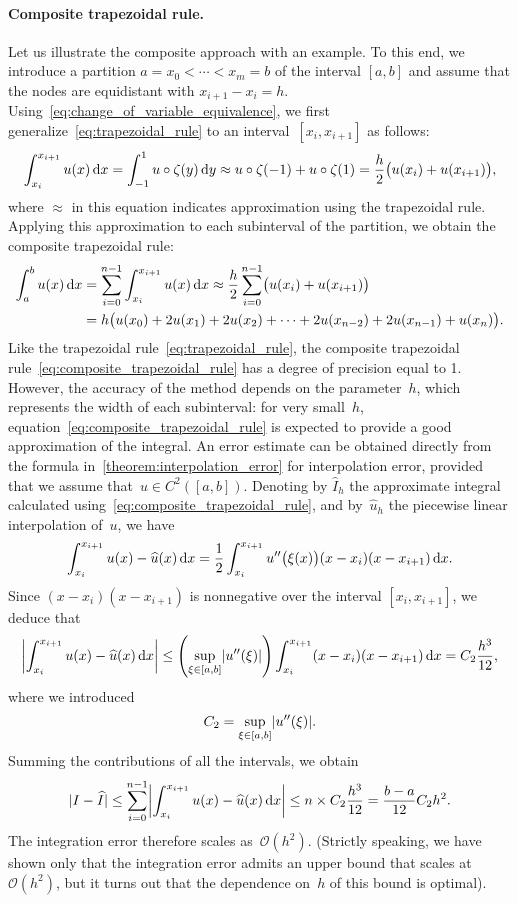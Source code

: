 \paragraph{Composite trapezoidal rule.}
Let us illustrate the composite approach with an example.
To this end,
we introduce a partition $a = x_0 < \dotsb < x_m = b$ of the interval $[a, b]$ and
assume that the nodes are equidistant with $x_{i+1} - x_i = h$.
Using~\eqref{eq:change_of_variable_equivalence},
we first generalize~\eqref{eq:trapezoidal_rule} to an interval~$[x_i, x_{i+1}]$ as follows:
\[
    \int_{x_i}^{x_{i+1}} u(x) \, \mathrm d x
    = \int_{-1}^{1} u \circ \zeta (y) \, \mathrm d y
    \approx u \circ \zeta(-1)  + u \circ \zeta(1)
    = \frac{h}{2} \bigl(u(x_i) + u(x_{i+1})\bigr),
\]
where $\approx$ in this equation indicates approximation using the trapezoidal rule.
Applying this approximation to each subinterval of the partition,
we obtain the composite trapezoidal rule:
\begin{align}
    \notag
    \int_{a}^{b} u(x) \, \mathrm d x
    &= \sum_{i=0}^{n-1} \int_{x_i}^{x_{i+1}} u(x) \, \mathrm d x
    \approx
    \frac{h}{2}\sum_{i=0}^{n-1} \bigl( u(x_i) + u(x_{i+1}) \bigr) \\
    \label{eq:composite_trapezoidal_rule}
    &= h \bigl( u(x_0) + 2 u(x_1) + 2 u(x_2) + \dotsb + 2 u(x_{n-2}) + 2 u(x_{n-1}) + u(x_n) \bigr).
\end{align}
Like the trapezoidal rule~\eqref{eq:trapezoidal_rule},
the composite trapezoidal rule~\eqref{eq:composite_trapezoidal_rule} has a degree of precision equal to 1.
However,
the accuracy of the method depends on the parameter~$h$,
which represents the width of each subinterval:
for very small~$h$,
equation~\eqref{eq:composite_trapezoidal_rule} is expected to provide a good approximation of the integral.
An error estimate can be obtained directly from the formula in~\cref{theorem:interpolation_error} for interpolation error,
provided that we assume that~$u \in C^2([a, b])$.
Denoting by $\widehat I_h$ the approximate integral calculated using~\eqref{eq:composite_trapezoidal_rule},
and by~$\widehat u_h$ the piecewise linear interpolation of~$u$,
we have
\[
    \int_{x_{i}}^{x_{i+1}} u(x) - \widehat u(x) \, \mathrm d x
    = \frac{1}{2} \int_{x_{i}}^{x_{i+1}} u''\bigl(\xi(x)\bigr) (x - x_{i}) (x - x_{i+1}) \, \mathrm d x.
\]
Since $(x - x_i) (x - x_{i+1})$ is nonnegative over the interval $[x_i, x_{i+1}]$,
we deduce that
\[
    \abs*{\int_{x_{i}}^{x_{i+1}} u(x) - \widehat u(x) \, \d x}
    \leq \left( \sup_{\xi \in [a, b]} \abs*{u''(\xi)} \right) \int_{x_{i}}^{x_{i+1}} (x - x_{i}) (x - x_{i+1}) \, \d x 
    = C_2 \frac{h^3}{12},
\]
where we introduced
\[
    C_2 =  \sup_{\xi \in [a, b]} \abs*{u''(\xi)} .
\]
Summing the contributions of all the intervals,
we obtain
\[
    \abs{I - \widehat I}
    \leq \sum_{i=0}^{n-1} \abs*{\int_{x_i}^{x_{i+1}} u(x) - \widehat u(x) \, \d x } 
    \leq n \times C_2 \frac{h^3}{12} = \frac{b-a}{12} C_2 h^2.
\]
The integration error therefore scales as~$\mathcal O(h^2)$.
(Strictly speaking, we have shown only that the integration error admits an upper bound that scales at $\mathcal O(h^2)$,
but it turns out that the dependence on~$h$ of this bound is optimal).

